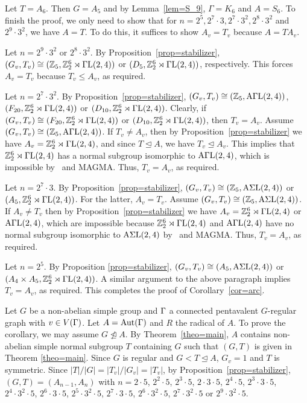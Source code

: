 \documentclass[12pt]{article}
\def\f{\noindent}
\def\Aut{\hbox{\rm Aut}}
\newcommand{\qed}{\mbox{\raisebox{0.7ex}{\fbox{}}} \vspace{4truemm}}
\def\mz{{\mathbb Z}}
\begin{document}
Let $T=A_6$. Then $G=A_5$ and by Lemma~\ref{lem=S_9}, $\Gamma=K_6$ and $A=S_6$. To finish the proof,
we only need to show that for $n=2^5, 2^7 \cdot 3, 2^7 \cdot 3^2, 2^8 \cdot 3^2$ and $2^9\cdot 3^2$,
we have $A=T$. To do this, it suffices to show $A_v=T_v$ because $A=TA_v$.

Let $n=2^9\cdot 3^2$ or $2^8 \cdot 3^2$. By  Proposition~\ref{prop=stabilizer}, $(G_v,T_v)\cong (\mz_5,\mz_2^6\rtimes \rm \Gamma L(2,4))$ or $(D_5,\mz_2^6\rtimes \rm \Gamma L(2,4))$, respectively. This forces $A_v=T_v$ because $T_v\leq A_v$, as required.

Let $n=2^7\cdot 3^2$. By Proposition~\ref{prop=stabilizer}, $(G_v,T_v)\cong (\mz_5,\rm A \Gamma L(2,4))$,
$(F_{20},\mz_2^6\rtimes \rm \Gamma L(2,4))$ or $(D_{10},\mz_2^6\rtimes \rm \Gamma L(2,4))$.
Clearly, if $(G_v,T_v)\cong (F_{20},\mz_2^6\rtimes \rm \Gamma L(2,4))$ or $(D_{10},\mz_2^6\rtimes \rm \Gamma L(2,4))$,
then $T_v=A_v$. Assume $(G_v,T_v)\cong (\mz_5,\rm A \Gamma L(2,4))$. If $T_v\not=A_v$,
then by Proposition~\ref{prop=stabilizer} we have $A_v=\mz_2^6\rtimes \rm \Gamma L(2,4)$,
and since $T\trianglelefteq A$, we have $T_v\unlhd A_v$. This implies that $\mz_2^6\rtimes \rm \Gamma L(2,4)$ has a normal subgroup isomorphic to $\rm A\Gamma L(2,4)$, which is impossible by~\cite[Theorem 1.1]{Weiss} and MAGMA. Thus, $T_v=A_v$, as required.

Let $n=2^7 \cdot 3$. By Proposition~\ref{prop=stabilizer}, $(G_v,T_v)\cong (\mz_5,\rm A \Sigma L(2,4))$ or $(A_5,\mz_2^6\rtimes \rm \Gamma L(2,4))$. For the latter, $A_v=T_v$. Assume $(G_v,T_v)\cong (\mz_5,\rm A \Sigma L(2,4))$. If $A_v\not=T_v$ then by Proposition~\ref{prop=stabilizer} we have $A_v=\mz_2^6\rtimes \rm \Gamma L(2,4)$ or $\rm A \Gamma L(2,4)$, which are impossible because $\mz_2^6\rtimes \rm \Gamma L(2,4)$ and $\rm A \Gamma L(2,4)$ have no normal subgroup isomorphic to $\rm A\Sigma L(2,4)$ by~\cite[Theorem 1.1]{Weiss} and MAGMA. Thus, $T_v=A_v$, as required.

Let $n=2^5$. By Proposition \ref{prop=stabilizer}, $(G_v,T_v)\cong (A_5,\rm A \Sigma L(2,4))$ or $(A_4 \times A_5,\mz_2^6\rtimes \rm \Gamma L(2,4))$. A similar argument to the above paragraph implies $T_v=A_v$, as required. This completes the proof of Corollary~\ref{cor=arc}.
\hfill\qed

\f {\bf The proof of Corollary \ref{cor=regular}:} Let $G$ be a non-abelian simple group and $\Gamma$ a connected pentavalent $G$-regular graph with $v\in V(\Gamma)$. Let $A=\Aut(\G)$ and $R$ the radical of $A$. To prove the corollary, we may assume $G\ntrianglelefteq A$. By Theorem~\ref{theo=main}, $A$ contains non-abelian simple normal subgroup $T$ containing $G$ such that $(G,T)$ is given in Theorem \ref{theo=main}. Since $G$ is regular and $G< T\unlhd A$, $G_v=1$ and $T$ is symmetric. Since $|T|/|G|=|T_v|/|G_v|=|T_v|$, by Proposition~\ref{prop=stabilizer}, $(G,T)=(A_{n-1},A_n)$ with $n=2\cdot 5$, $2^2\cdot 5$, $2^3\cdot5$, $2\cdot3\cdot 5$, $2^4\cdot5$, $2^3\cdot 3\cdot5$, $2^4\cdot 3^2\cdot5$, $2^6\cdot 3\cdot5$, $2^5\cdot 3^2\cdot5$, $2^7\cdot 3\cdot5$, $2^6\cdot 3^2\cdot5$, $2^7\cdot 3^2\cdot5$ or $2^9\cdot 3^2\cdot5$.
\hfill\qed
\medskip
\end{document}
